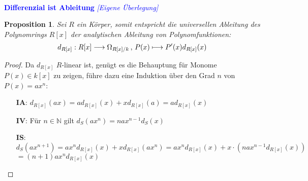 \documentclass[10pt,a4paper]{report}
\newcounter{Aussage}[chapter]
\newtheorem{prop}[Aussage]{Proposition}
\newcommand{\function}[5]{\nolinebreak{#1:#2 \longrightarrow #3 \, , \, #4 \longmapsto #5}}
\newcommand{\divR}[2]{\Omega_{#1/#2}}
\newcommand{\divf}[1]{d_{#1}}
\begin{document}
\ \\
\textcolor{blue}{\textbf{Differenzial ist Ableitung} \textit{[Eigene Überlegung]}}
\begin{prop}\label{Differenzial ist Ableitung}
Sei $R$ ein Körper, somit entspricht die universellen Ableitung des Polynomrings $R[x]$ der analytischen Ableitung von Polynomfunktionen:
\begin{gather*}
\function{\divf{R[x]}}{R[x]}{\divR{R[x]}{k}}{P(x)}{P'(x)\divf{R[x]}(x)}
\end{gather*}
\end{prop}
\begin{proof}
Da $\divf{R[x]}$ $R$-linear ist, genügt es die Behauptung für Monome $P(x) \in k[x]$ zu zeigen, führe dazu eine Induktion über den Grad $n$ von $P(x) = ax^n$:
\begin{spacing}{1.5}
\begin{itemize}
\item[\textbf{IA}:] $\divf{R[x]}(ax) = a\divf{R[x]}(x) + x\divf{R[x]}(a) = a\divf{R[x]}(x)$
\item[\textbf{IV}:] Für $n \in \mathbb{N}$ gilt $\divf{S}(ax^n) = na x^{n-1}\divf{S}(x)$
\item[\textbf{IS}:] 
$\divf{S}(ax^{n+1}) = ax^n\divf{R[x]}(x) + x\divf{R[x]}(ax^n) = ax^n\divf{R[x]}(x) + x \cdot (na x^{n-1}\divf{R[x]}(x))$\\
$ = (n+1)ax^n\divf{R[x]}(x)$
\end{itemize}
\end{spacing}
\end{proof}
\end{document}
